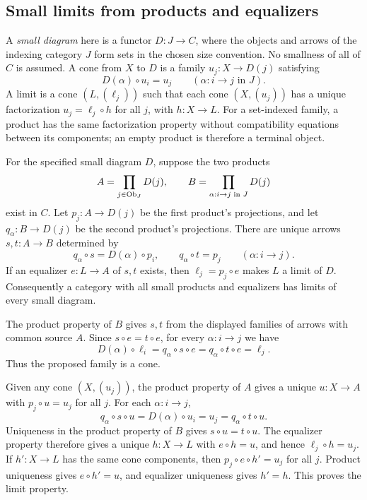 \subsection{Small limits from products and equalizers}
A \emph{small diagram} here is a functor $D:J\to C$, where the
objects and arrows of the indexing category $J$ form sets in the chosen
size convention. No smallness of all of $C$ is assumed. A cone from
$X$ to $D$ is a family $u_j:X\to D(j)$ satisfying
\[
D(\alpha)\circ u_i=u_j\qquad(\alpha:i\to j\text{ in }J).
\]
A limit is a cone $(L,(\ell_j))$ such that each cone $(X,(u_j))$
has a unique factorization $u_j=\ell_j\circ h$ for all $j$, with
$h:X\to L$. For a set-indexed family, a product has the same
factorization property without compatibility equations between its
components; an empty product is therefore a terminal object.

\begin{theorem}
\label{thm:small_limits_products_equalizer}
For the specified small diagram $D$, suppose the two products
\[
A=\prod_{j\in{\textrm{Ob}}_J}D(j),\qquad
B=\prod_{\alpha:i\to j\text{ in }J}D(j)
\]
exist in $C$. Let $p_j:A\to D(j)$ be the first product's projections,
and let $q_\alpha:B\to D(j)$ be the second product's projections.
There are unique arrows $s,t:A\to B$ determined by
\[
q_\alpha\circ s=D(\alpha)\circ p_i,\qquad
q_\alpha\circ t=p_j\qquad(\alpha:i\to j).
\]
If an equalizer $e:L\to A$ of $s,t$ exists, then
$\ell_j=p_j\circ e$ makes $L$ a limit of $D$.
Consequently a category with all small products and equalizers has
limits of every small diagram.
\end{theorem}
\Proof
The product property of $B$ gives $s,t$ from the displayed families
of arrows with common source $A$. Since $s\circ e=t\circ e$,
for every $\alpha:i\to j$ we have
\[
D(\alpha)\circ\ell_i
=q_\alpha\circ s\circ e
=q_\alpha\circ t\circ e=\ell_j.
\]
Thus the proposed family is a cone.

Given any cone $(X,(u_j))$, the product property of $A$ gives a
unique $u:X\to A$ with $p_j\circ u=u_j$ for all $j$.
For each $\alpha:i\to j$,
\[
q_\alpha\circ s\circ u=D(\alpha)\circ u_i
=u_j=q_\alpha\circ t\circ u.
\]
Uniqueness in the product property of $B$ gives $s\circ u=t\circ u$.
The equalizer property therefore gives a unique $h:X\to L$ with
$e\circ h=u$, and hence $\ell_j\circ h=u_j$.
If $h':X\to L$ has the same cone components, then
$p_j\circ e\circ h'=u_j$ for all $j$. Product uniqueness gives
$e\circ h'=u$, and equalizer uniqueness gives $h'=h$.
This proves the limit property.

